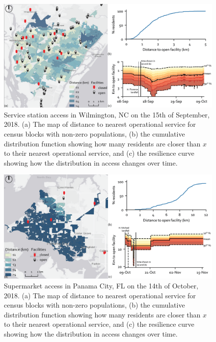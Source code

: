 \documentclass[9pt,twoside,lineno]{pnas-new}
\begin{document}
\begin{figure}
    \centering
    \includegraphics[width=\linewidth]{report/fig/FigS_NC_resilience.png}
    \caption{
    Service station access in Wilmington, NC on the 15th of September, 2018. (a) The map of distance to nearest operational service for census blocks with non-zero populations, (b) the cumulative distribution function showing how many residents are closer than $x$ to their nearest operational service, and (c) the resilience curve showing how the distribution in access changes over time.
    }
    \label{figS:nc_grocery}
\end{figure}

\begin{figure}
    \centering
    \includegraphics[width=\linewidth]{report/fig/FigS_fl_supermarket.png}
    \caption{
    Supermarket access in Panama City, FL on the 14th of October, 2018. (a) The map of distance to nearest operational service for census blocks with non-zero populations, (b) the cumulative distribution function showing how many residents are closer than $x$ to their nearest operational service, and (c) the resilience curve showing how the distribution in access changes over time.
    }
    \label{figS:fl_grocery}
\end{figure}


\end{document}
